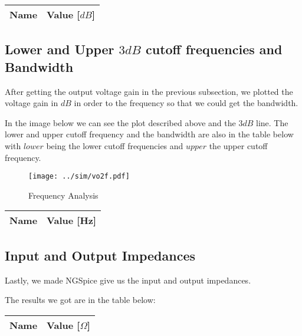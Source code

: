 \begin{table}[H]
  \centering
  \begin{tabular}{|l|r|}
    \hline    
    {\bf Name} & {\bf Value [$dB$]} \\ \hline
    
  \end{tabular}
  \label{tab:voltage}
\end{table}

\subsection{Lower and Upper $3dB$ cutoff frequencies and Bandwidth}
After getting the output voltage gain in the previous subsection, we plotted the voltage gain in $dB$ in order to the frequency so that we could get the bandwidth. \par
In the image below we can see the plot described above and the $3dB$ line. The lower and upper cutoff frequency and the bandwidth are also in the table below with $lower$ being the lower cutoff frequencies and $upper$ the upper cutoff frequency.

\begin{figure}[H] \centering
\texttt{[image: ../sim/vo2f.pdf]}
\caption{Frequency Analysis}
\label{fig:frequency}
\end{figure}

\begin{table}[H]
  \centering
  \begin{tabular}{|l|r|}
    \hline    
    {\bf Name} & {\bf Value [Hz]} \\ \hline
    
  \end{tabular}
  \label{tab:bandwidth}
\end{table}

\subsection{Input and Output Impedances}
Lastly, we made NGSpice give us the input and output impedances. \par
The results we got are in the table below: 

\begin{table}[H]
  \centering
  \begin{tabular}{|l|r|}
    \hline    
    {\bf Name} & {\bf Value [$\Omega$]} \\ \hline
    
  \end{tabular}
  \label{tab:impedance}
\end{table}




